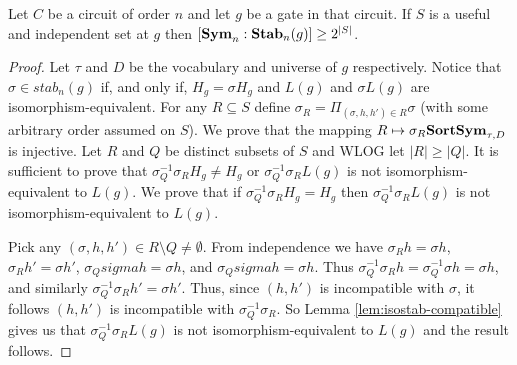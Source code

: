 \documentclass[../paper.tex]{subfiles}
\begin{document}
\begin{lem}
  \label{lem:useful-independant-set}
  Let $C$ be a circuit of order $n$ and let $g$ be a gate in that circuit. If
  $S$ is a useful and independent set at $g$ then $[\text{\textbf{Sym}}_n : \text{\textbf{Stab}}_n(g)] \geq
  2^{\vert S \vert}$.
\end{lem}
\begin{proof}
  Let $\tau$ and $D$ be the vocabulary and universe of $g$ respectively. Notice
  that $\sigma \in stab_n(g)$ if, and only if, $H_g = \sigma H_g$ and $L(g)$ and
  $\sigma L(g)$ are isomorphism-equivalent. For any $R \subseteq S$ define
  $\sigma_R = \Pi_{(\sigma, h, h') \in R} \sigma$ (with some arbitrary order
  assumed on $S$). We prove that the mapping $R \mapsto \sigma_R \text{\textbf{SortSym}}_{\tau,D}$ is
  injective. Let $R$ and $Q$ be distinct subsets of $S$ and WLOG let $\vert R
  \vert \geq \vert Q \vert$. It is sufficient to prove that $\sigma^{-1}_Q
  \sigma_R H_g \neq H_g$ or $\sigma^{-1}_Q \sigma_R L(g)$ is not
  isomorphism-equivalent to $L(g)$. We prove that if $\sigma^{-1}_Q \sigma_R H_g
  = H_g$ then $\sigma^{-1}_Q \sigma_R L(g)$ is not isomorphism-equivalent to
  $L(g)$.

  Pick any $(\sigma, h, h') \in R \setminus Q \neq \emptyset$. From independence
  we have $\sigma_R h = \sigma h$, $\sigma_R h' = \sigma h'$, $\sigma_Q sigma h
  = \sigma h $, and $\sigma_Q sigma h = \sigma h$. Thus $\sigma^{-1}_Q \sigma_R
  h = \sigma^{-1}_Q \sigma h = \sigma h$, and similarly $\sigma^{-1}_Q\sigma_R
  h' = \sigma h'$. Thus, since $(h, h')$ is incompatible with $\sigma$, it
  follows $(h, h')$ is incompatible with $\sigma^{-1}_Q\sigma_R$. So Lemma
  \ref{lem:isostab-compatible} gives us that $\sigma^{-1}_Q \sigma_R L(g)$ is
  not isomorphism-equivalent to $L(g)$ and the result follows.
\end{proof}




%



\end{document}
